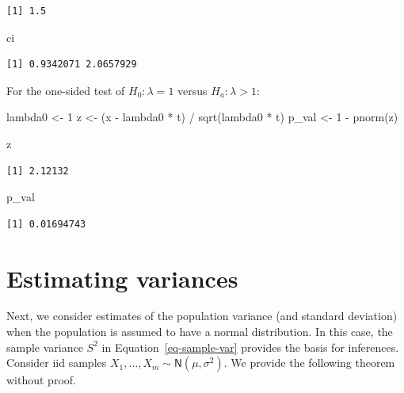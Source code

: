 \documentclass[
  a4paper,
  DIV=11,
  numbers=noendperiod,
  oneside]{scrreprt}
\newenvironment{Shaded}{\begin{snugshade}}{\end{snugshade}}
\newcommand{\DecValTok}[1]{\textcolor[rgb]{0.68,0.00,0.00}{#1}}
\newcommand{\FunctionTok}[1]{\textcolor[rgb]{0.28,0.35,0.67}{#1}}
\newcommand{\NormalTok}[1]{\textcolor[rgb]{0.00,0.23,0.31}{#1}}
\newcommand{\OtherTok}[1]{\textcolor[rgb]{0.00,0.23,0.31}{#1}}
\newcommand{\SpecialCharTok}[1]{\textcolor[rgb]{0.37,0.37,0.37}{#1}}
\theoremstyle{plain}
\theoremstyle{definition}
\theoremstyle{definition}
\theoremstyle{definition}
\theoremstyle{plain}
\theoremstyle{remark}
\begin{document}
\begin{verbatim}
[1] 1.5
\end{verbatim}

\begin{Shaded}
\begin{Highlighting}[]
\NormalTok{ci}
\end{Highlighting}
\end{Shaded}

\begin{verbatim}
[1] 0.9342071 2.0657929
\end{verbatim}

For the one-sided test of \(H_0:\lambda=1\) versus \(H_a:\lambda>1\):

\begin{Shaded}
\begin{Highlighting}[]
\NormalTok{lambda0 }\OtherTok{\textless{}{-}} \DecValTok{1}
\NormalTok{z }\OtherTok{\textless{}{-}}\NormalTok{ (x }\SpecialCharTok{{-}}\NormalTok{ lambda0 }\SpecialCharTok{*}\NormalTok{ t) }\SpecialCharTok{/} \FunctionTok{sqrt}\NormalTok{(lambda0 }\SpecialCharTok{*}\NormalTok{ t)}
\NormalTok{p\_val }\OtherTok{\textless{}{-}} \DecValTok{1} \SpecialCharTok{{-}} \FunctionTok{pnorm}\NormalTok{(z)}

\NormalTok{z}
\end{Highlighting}
\end{Shaded}

\begin{verbatim}
[1] 2.12132
\end{verbatim}

\begin{Shaded}
\begin{Highlighting}[]
\NormalTok{p\_val}
\end{Highlighting}
\end{Shaded}

\begin{verbatim}
[1] 0.01694743
\end{verbatim}

\section{Estimating variances}\label{sec-estimating-variances}

Next, we consider estimates of the population variance (and standard
deviation) when the population is assumed to have a normal distribution.
In this case, the sample variance \(S^2\) in
Equation~\ref{eq-sample-var} provides the basis for inferences. Consider
iid samples \(X_1, \dots, X_m \sim \mathsf{N}(\mu, \sigma^2).\) We
provide the following theorem without proof.
\end{document}
